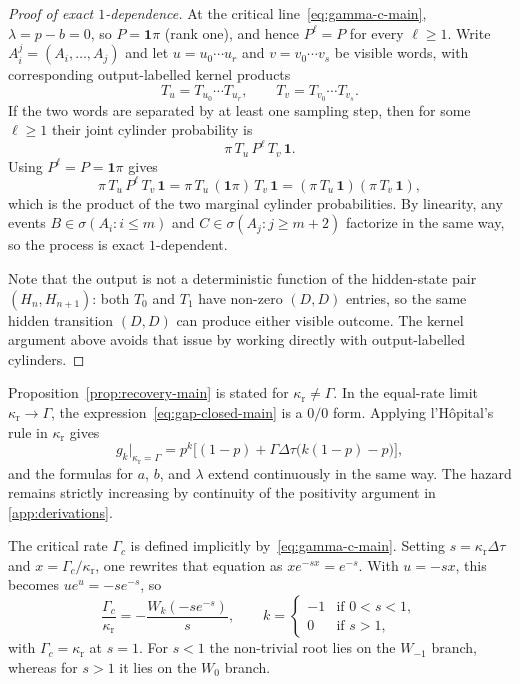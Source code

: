 \begin{proof}[Proof of exact $1$-dependence]
At the critical line~\eqref{eq:gamma-c-main}, $\lambda=p-b=0$, so $P=\mathbf{1}\pi$ (rank one), and hence $P^\ell=P$ for every $\ell\ge1$. Write $A_i^j=(A_i,\dots,A_j)$ and let $u=u_0\cdots u_r$ and $v=v_0\cdots v_s$ be visible words, with corresponding output-labelled kernel products
\[
T_u=T_{u_0}\cdots T_{u_r},
\qquad
T_v=T_{v_0}\cdots T_{v_s}.
\]
If the two words are separated by at least one sampling step, then for some $\ell\ge1$ their joint cylinder probability is
\[
\pi\,T_u\,P^\ell\,T_v\,\mathbf{1}.
\]
Using $P^\ell=P=\mathbf{1}\pi$ gives
\[
\pi\,T_u\,P^\ell\,T_v\,\mathbf{1}
=
\pi\,T_u\,(\mathbf{1}\pi)\,T_v\,\mathbf{1}
=
(\pi\,T_u\,\mathbf{1})(\pi\,T_v\,\mathbf{1}),
\]
which is the product of the two marginal cylinder probabilities. By linearity, any events $B\in\sigma(A_i:i\le m)$ and $C\in\sigma(A_j:j\ge m+2)$ factorize in the same way, so the process is exact $1$-dependent.

Note that the output is not a deterministic function of the hidden-state pair $(H_n,H_{n+1})$: both $T_0$ and $T_1$ have non-zero $(D,D)$ entries, so the same hidden transition $(D,D)$ can produce either visible outcome. The kernel argument above avoids that issue by working directly with output-labelled cylinders.
\end{proof}

\begin{remark}\label{rem:edge-cases}
Proposition~\ref{prop:recovery-main} is stated for $\kappa_{\mathrm r}\neq\Gamma$. In the equal-rate limit $\kappa_{\mathrm r}\to\Gamma$, the expression~\eqref{eq:gap-closed-main} is a $0/0$ form. Applying l'H\^opital's rule in $\kappa_{\mathrm r}$ gives
\[
g_k\big|_{\kappa_{\mathrm r}=\Gamma}
=
p^k\bigl[(1-p)+\Gamma\Delta\tau\bigl(k(1-p)-p\bigr)\bigr],
\]
and the formulas for $a$, $b$, and $\lambda$ extend continuously in the same way. The hazard remains strictly increasing by continuity of the positivity argument in \cref{app:derivations}.

The critical rate $\Gamma_c$ is defined implicitly by~\eqref{eq:gamma-c-main}. Setting $s=\kappa_{\mathrm r}\Delta\tau$ and $x=\Gamma_c/\kappa_{\mathrm r}$, one rewrites that equation as $xe^{-sx}=e^{-s}$. With $u=-sx$, this becomes $ue^u=-se^{-s}$, so
\begin{equation}\label{eq:lambert-Gc}
\frac{\Gamma_c}{\kappa_{\mathrm r}}
=
-\frac{W_k(-se^{-s})}{s},
\qquad
k=
\begin{cases}
-1 & \text{if } 0<s<1, \\
 0 & \text{if } s>1,
\end{cases}
\end{equation}
with $\Gamma_c=\kappa_{\mathrm r}$ at $s=1$. For $s<1$ the non-trivial root lies on the $W_{-1}$ branch, whereas for $s>1$ it lies on the $W_0$ branch.
\end{remark}

